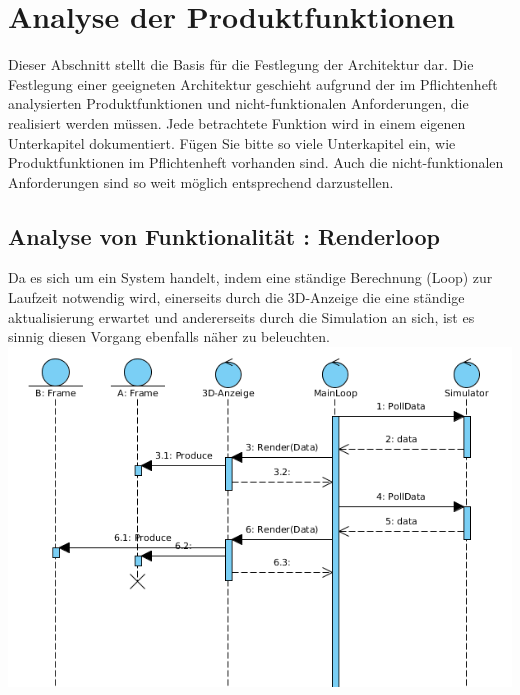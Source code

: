 \chapter{Analyse der Produktfunktionen}

Dieser Abschnitt stellt die Basis für die Festlegung der Architektur dar. Die
Festlegung einer geeigneten Architektur geschieht aufgrund der im Pflichtenheft
analysierten Produktfunktionen und nicht-funktionalen Anforderungen, die
realisiert werden müssen. Jede betrachtete Funktion wird in einem eigenen
Unterkapitel dokumentiert.  Fügen Sie bitte so viele Unterkapitel ein, wie
Produktfunktionen im Pflichtenheft vorhanden sind. Auch die nicht-funktionalen
Anforderungen sind so weit möglich entsprechend darzustellen.

%






\section{Analyse von Funktionalität :  Renderloop}
Da es sich um ein System handelt, indem eine ständige Berechnung (Loop) zur Laufzeit notwendig wird, einerseits durch die 3D-Anzeige die eine ständige aktualisierung erwartet und andererseits durch
die Simulation an sich, ist es sinnig diesen Vorgang ebenfalls näher zu beleuchten.
\includegraphics[width=16cm]{bilder/render_loop}

